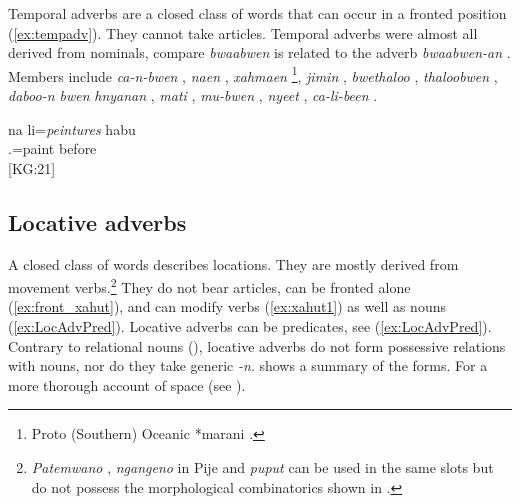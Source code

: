 Temporal adverbs are a closed class of words that can occur in a fronted position (\ref{ex:tempadv}). They cannot take articles. Temporal adverbs were almost all derived from nominals, compare \textit{bwaabwen}  is related to the adverb \textit{bwaabwen-an} . Members include \textit{ca-n-bwen} , \textit{naen} , \textit{xahmaen} \footnote{Proto (Southern) Oceanic *marani \parencite[314]{lynch_efate-erromango_2004}.}, \textit{jimin} , \textit{bwethaloo} , \textit{thaloobwen} , \textit{daboo-n bwen}  %
\textit{hnyanan} , \textit{mati} , \textit{mu-bwen} , \textit{nyeet} , \textit{ca-li-been} . 

\ea \label{ex:tempadv}
\gll na li=\textit{peintures} habu\\
  .=paint before\\
\glt {} {[KG:21]}
\z

\subsection{Locative adverbs}
\label{ssec:WCLocAdv}
A closed class of words describes locations. They are mostly derived from movement verbs.\footnote{\textit{Patemwano} , \textit{ngangeno}  in Pije \parencite[170]{haudricourt_dictionnaire_1982} and \textit{puput}  can be used in the same slots but do not possess the morphological combinatorics shown in .} They do not bear articles, can be fronted alone (\ref{ex:front_xahut}), and can modify verbs (\ref{ex:xahut1}) as well as nouns (\ref{ex:LocAdvPred}). Locative adverbs can be predicates, see (\ref{ex:LocAdvPred}). Contrary to relational nouns (), locative adverbs do not form possessive relations with nouns, nor do they take generic \textit{-n}.  shows a summary of the forms. For a more thorough account of space (see ).


